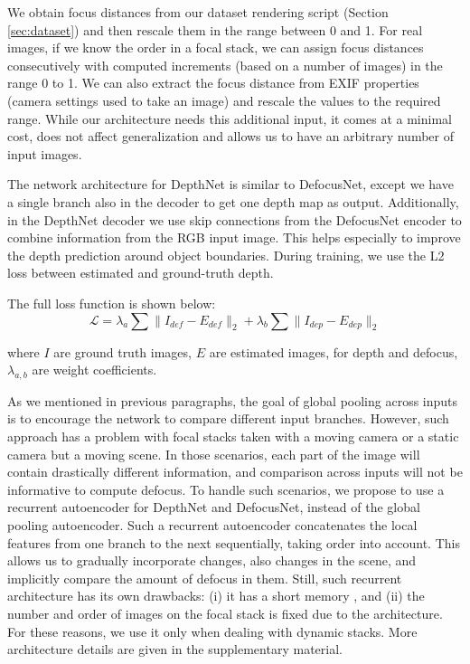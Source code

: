 \documentclass[10pt,twocolumn,letterpaper]{article}
\begin{document}
We obtain focus distances from our dataset rendering script (Section \ref{sec:dataset}) and then rescale them in the range between 0 and 1.
For real images, if we know the order in a focal stack, we can assign focus distances consecutively with computed increments (based on a number of images) in the range 0 to 1. We can also extract the focus distance from EXIF properties (camera settings used to take an image) and rescale the values to the required range. 
While our architecture needs this additional input, it comes at a minimal cost, does not affect generalization and allows us to have an arbitrary number of input images.

The network architecture for DepthNet is similar to DefocusNet, except we have a single branch also in the decoder to get one depth map as output.
Additionally, in the DepthNet decoder we use
skip connections from the DefocusNet encoder to combine information from the RGB input image. This helps especially to improve the depth prediction around object boundaries.
During training, we use the L2 loss between estimated and ground-truth depth.

The full loss function is shown below:
\begin{equation}
\label{eq:depth_loss}
\mathcal{L} = \lambda_{a}\sum \| I_{def} - E_{def}\|_{2} + 
  \lambda_{b}\sum \| I_{dep} - E_{dep}\|_{2}
\end{equation}


where $I$ are ground truth images, $E$ are estimated images, for depth and defocus, $\lambda_{a,b}$ are weight coefficients.


As we mentioned in previous paragraphs, the goal of global pooling across inputs is to encourage the network to compare different input branches. 
However, such approach has a problem with focal stacks taken with a moving camera or a static camera but a moving scene. In those scenarios, each part of the image will contain drastically different information, and comparison across inputs will not be informative to compute defocus.
To handle such scenarios, we propose to use a recurrent autoencoder \cite{DBLP:journals/tog/ChaitanyaKSSLNA17} for DepthNet and DefocusNet, instead of the global pooling autoencoder.
Such a recurrent autoencoder concatenates the local features from one branch to the next sequentially, taking order into account. 
This allows us to gradually incorporate changes, also changes in the scene, and implicitly compare the amount of defocus in them.
Still, such recurrent architecture has its own drawbacks: (i) it has a short memory \cite{DBLP:journals/tnn/BengioSF94}, and (ii) the number and order of images on the focal stack is fixed due to the architecture. 
For these reasons, we use it only when dealing with dynamic stacks.
More architecture details are given in the supplementary material.
\end{document}

